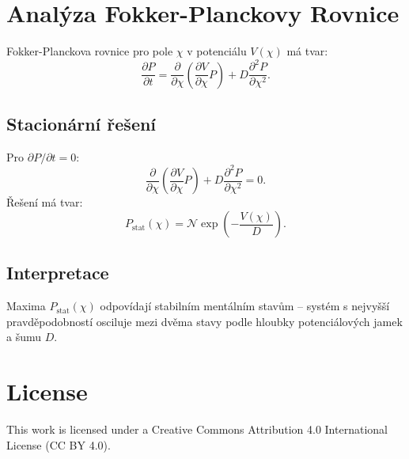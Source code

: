 \documentclass{article}
\begin{document}
\section*{Analýza Fokker-Planckovy Rovnice}

Fokker-Planckova rovnice pro pole $\chi$ v potenciálu $V(\chi)$ má tvar:
\[
\frac{\partial P}{\partial t} = \frac{\partial}{\partial \chi} \left( \frac{\partial V}{\partial \chi} P \right) + D \frac{\partial^2 P}{\partial \chi^2}.
\]

\subsection*{Stacionární řešení}
Pro $\partial P/\partial t = 0$:
\[
\frac{\partial}{\partial \chi} \left( \frac{\partial V}{\partial \chi} P \right) + D \frac{\partial^2 P}{\partial \chi^2} = 0.
\]
Řešení má tvar:
\[
P_{\text{stat}}(\chi) = \mathcal{N} \exp\left(-\frac{V(\chi)}{D}\right).
\]

\subsection*{Interpretace}
Maxima $P_{\text{stat}}(\chi)$ odpovídají stabilním mentálním stavům – systém s nejvyšší pravděpodobností osciluje mezi dvěma stavy podle hloubky potenciálových jamek a šumu $D$.


\section*{License}
This work is licensed under a Creative Commons Attribution 4.0 International License (CC BY 4.0).
\end{document}
